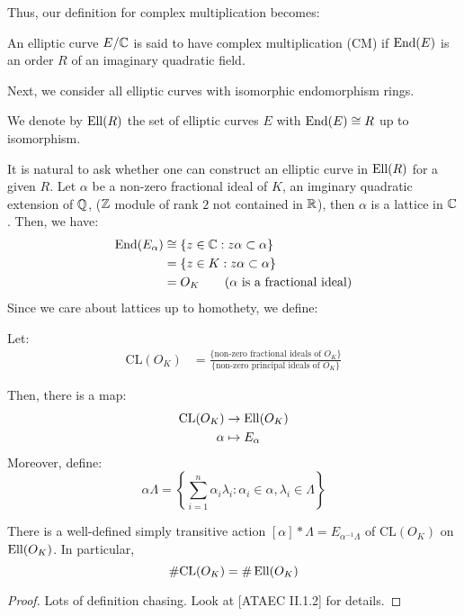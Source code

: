 \documentclass[12pt]{article}
\begin{document}
Thus, our definition for complex multiplication becomes:

\begin{definition}
    An elliptic curve $E/\mathbb C$ is said to have complex multiplication (CM) if $\operatorname{End}(E)$ is an order $R$ of an imaginary quadratic field.
\end{definition}

Next, we consider all elliptic curves with isomorphic endomorphism rings.

\begin{definition}
    We denote by $\operatorname{Ell}(R)$ the set of elliptic curves $E$ with $\operatorname{End}(E) \cong R$ up to isomorphism.
\end{definition}

It is natural to ask whether one can construct an elliptic curve in $\operatorname{Ell}(R)$ for a given $R$. Let $\alpha$ be a non-zero fractional ideal of $K$, an imginary quadratic extension of $\mathbb Q$, ($\mathbb Z$ module of rank $2$ not contained in $\mathbb R$), then $\alpha$ is a lattice in $\mathbb C$. Then, we have:
\begin{align*}
    \operatorname{End}(E_\alpha) &\cong \{ z \in \mathbb C : z\alpha \subset \alpha \} \\
    &= \{ z \in K : z\alpha \subset \alpha \} \\
    &= O_K \qquad (\text{$\alpha$ is a fractional ideal})
\end{align*}
Since we care about lattices up to homothety, we define: 
\begin{definition}
    Let:
    \begin{align*}
        \text{CL}(O_K) &= \frac{\{ \text{non-zero fractional ideals of } O_K \}}{ \{\text{non-zero principal ideals of $O_K$}\}}
    \end{align*}
\end{definition}

Then, there is a map: 
\begin{align*}
    \text{CL}(O_K) &\to \operatorname{Ell}(O_K) \\
    \alpha &\mapsto E_\alpha
\end{align*}
Moreover, define: 
\[\alpha\Lambda = \left\{\sum_{i=1}^n\alpha_i\lambda_i : \alpha_i \in \alpha, \lambda_i \in \Lambda\right\}\]


\begin{prop}
    There is a well-defined simply transitive action $[\alpha] \ast \Lambda = E_{\alpha^{-1}\Lambda}$ of $\text{CL}(O_K)$ on $\operatorname{Ell}(O_K)$. In particular, 
    \[ \#\text{CL}(O_K) = \#\operatorname{Ell}(O_K) \]
\end{prop}
\begin{proof}
    Lots of definition chasing. Look at [ATAEC II.1.2] for details.
\end{proof}
\end{document}
